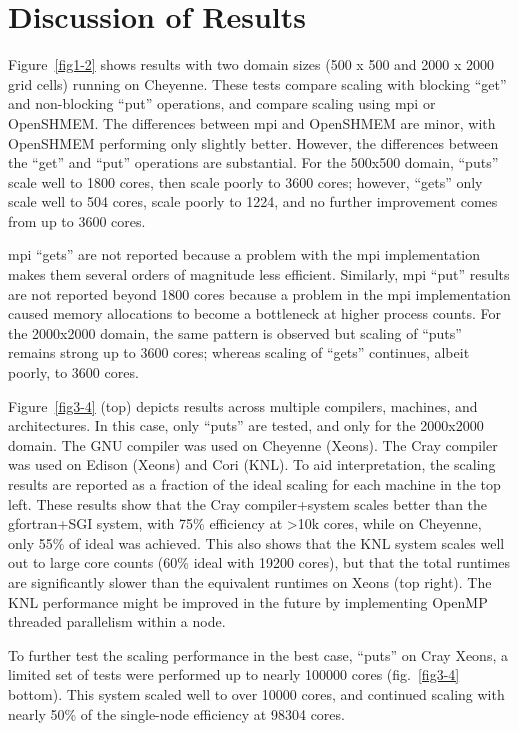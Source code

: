 \section{Discussion of Results}
Figure~\ref{fig1-2} shows results with two domain sizes (500 x 500 and 2000 x 2000 grid cells) running on Cheyenne.
These tests compare scaling with blocking ``get'' and non-blocking ``put'' operations, and compare scaling using \gls{mpi} or OpenSHMEM.
The differences between \gls{mpi} and OpenSHMEM are minor, with OpenSHMEM performing only slightly better.
However, the differences between the ``get'' and ``put'' operations are substantial.
For the 500x500 domain, ``puts'' scale well to 1800 cores, then scale poorly to \num{3600} cores;
however, ``gets'' only scale well to \num{504} cores, scale poorly to \num{1224}, and no further improvement comes from up to \num{3600} cores.

\gls{mpi} ``gets'' are not reported because a problem with the \gls{mpi} implementation makes them several orders of magnitude less efficient.
Similarly, \gls{mpi} ``put'' results are not reported beyond \num{1800} cores because a problem in the \gls{mpi} implementation caused memory
allocations to become a bottleneck at higher process counts.
For the 2000x2000 domain, the same pattern is observed but scaling of ``puts'' remains strong up to 3600 cores; whereas
scaling of ``gets'' continues, albeit poorly, to \num{3600} cores.

Figure~\ref{fig3-4} (top) depicts results across multiple compilers, machines, and architectures.
In this case, only ``puts'' are tested, and only for the 2000x2000 domain.
The GNU compiler was used on Cheyenne (Xeons). The Cray compiler was used on Edison (Xeons) and Cori (KNL).
To aid interpretation, the scaling results are reported as a fraction of the ideal scaling for each machine in the top left.
These results show that the Cray compiler+system scales better than the gfortran+SGI system,
with 75\% efficiency at >10k cores, while on Cheyenne, only 55\% of ideal was achieved.
This also shows that the KNL system scales well out to large core counts (60\% ideal with \num{19200} cores),
but that the total runtimes are significantly slower than the equivalent runtimes on Xeons (top right).
The KNL performance might be improved in the future by implementing OpenMP threaded parallelism within a node.

To further test the scaling performance in the best case, ``puts'' on Cray Xeons, a limited set of tests were performed up to nearly \num{100000} cores (fig.~\ref{fig3-4} bottom).
This system scaled well to over \num{10000} cores, and continued scaling with nearly 50\% of the single-node efficiency at \num{98304} cores.

